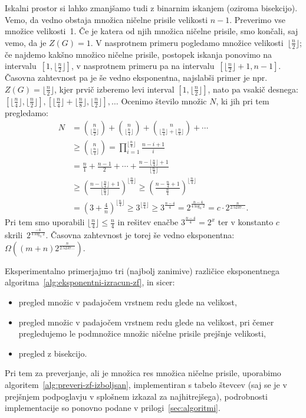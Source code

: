 \documentclass[12pt,a4paper,twoside]{article}
\theoremstyle{definition} %
\theoremstyle{plain} %
\numberwithin{equation}{section}  %
\begin{document}
Iskalni prostor si lahko zmanjšamo tudi z binarnim iskanjem (oziroma bisekcijo). Vemo, da vedno obstaja množica ničelne prisile velikosti $n-1$. Preverimo vse množice velikosti~1. Če je katera od njih množica ničelne prisile, smo končali, saj vemo, da je $Z(G) = 1$. V nasprotnem primeru pogledamo množice velikosti~$\lfloor \frac{n}{2} \rfloor$; če najdemo kakšno množico ničelne prisile, postopek iskanja ponovimo na intervalu~$[1,\lfloor \frac{n}{2} \rfloor]$, v nasprotnem primeru pa na intervalu~$[\lfloor \frac{n}{2} \rfloor + 1, n-1]$. 
Časovna zahtevnost pa je še vedno eksponentna, najslabši primer je npr.~$Z(G) = \lfloor \frac{n}{2} \rfloor$, kjer prvič izberemo levi interval $[1,\lfloor \frac{n}{2} \rfloor]$, nato pa vsakič desnega: $[\lfloor \frac{n}{4} \rfloor, \lfloor \frac{n}{2} \rfloor], [\lfloor \frac{n}{4} \rfloor + \lfloor \frac{n}{8} \rfloor, \lfloor \frac{n}{2} \rfloor], \ldots$ Ocenimo število množic $N$, ki jih pri tem pregledamo:
\begin{align*}
N &= \binom{n}{\lfloor \frac{n}{2} \rfloor} + \binom{n}{\lfloor \frac{n}{4} \rfloor} + \binom{n}{\lfloor \frac{n}{4} \rfloor + \lfloor \frac{n}{8} \rfloor}  + \cdots \\
&\geq   \binom{n}{\lfloor \frac{n}{4} \rfloor} = \prod_{i=1}^{\lfloor \frac{n}{4} \rfloor} \frac{n - i + 1}{i}  \\
&= \frac{n}{1} + \frac{n - 1}{2} + \cdots + \frac{n - \lfloor \frac{n}{4} \rfloor + 1}{\lfloor \frac{n}{4} \rfloor} \\
&\geq \left( \frac{n - \lfloor \frac{n}{4} \rfloor + 1}{\lfloor \frac{n}{4} \rfloor} \right)^{\lfloor \frac{n}{4} \rfloor} \geq  \left( \frac{n - \frac{n}{4} + 1}{\frac{n}{4}} \right)^{\lfloor \frac{n}{4} \rfloor} \\
&= \left( 3 +  \frac{4}{n} \right)^{\lfloor \frac{n}{4} \rfloor} \geq 3^{\lfloor \frac{n}{4} \rfloor} \geq 3^\frac{n-4}{4} = 2^\frac{n-4}{4 \log_3 2}= c \cdot 2^\frac{n}{2.5237\ldots}.
\end{align*}
Pri tem smo uporabili $\lfloor \frac{n}{4} \rfloor \leq \frac{n}{4}$ in rešitev enačbe $3^\frac{n-4}{4} = 2^x$ ter v konstanto $c$ skrili~$2^\frac{-4}{4\log_3 2}$. Časovna zahtevnost je torej še vedno eksponentna: $\Omega((m+n) 2^\frac{n}{2.5237\ldots})$.

Eksperimentalno primerjajmo tri (najbolj zanimive) različice eksponentnega algoritma~\ref{alg:eksponentni-izracun-zf}, in sicer:
\begin{itemize}
    \item pregled množic v padajočem vrstnem redu glede na velikost,
    \item pregled množic v padajočem vrstnem redu glede na velikost, pri čemer pregledujemo le podmnožice množic ničelne prisile prejšnje velikosti,
    \item pregled z bisekcijo.
\end{itemize}
Pri tem za preverjanje, ali je množica res množica ničelne prisile, uporabimo algoritem~\ref{alg:preveri-zf-izboljsan}, implementiran s tabelo števcev (saj se je v prejšnjem podpoglavju v splošnem izkazal za najhitrejšega), podrobnosti implementacije so ponovno podane v prilogi~\ref{sec:algoritmi}.
\end{document}
